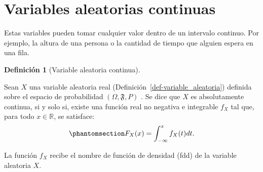 \documentclass[
  us-letterpaper,
]{scrreprt}
\theoremstyle{plain}
\theoremstyle{plain}
\theoremstyle{definition}
\newtheorem{definition}{Definición}[chapter]
\theoremstyle{remark}
\begin{document}
\section{Variables aleatorias
continuas}\label{variables-aleatorias-continuas}

\label{text-align:justify}
Estas variables pueden tomar cualquier valor dentro de un intervalo
continuo. Por ejemplo, la altura de una persona o la cantidad de tiempo
que alguien espera en una fila.

\begin{definition}[Variable aleatoria
continua]\protect\hypertarget{def-var_alea_cont}{}\label{def-var_alea_cont}

Sean \(X\) una variable aleatoria real
(Definición~\ref{def-variable_aleatoria}) definida sobre el espacio de
probabilidad \((\Omega, \mathfrak{F}, P)\) . Se dice que \(X\) es
absolutamente continua, si y solo si, existe una función real no
negativa e integrable \(f_X\) tal que, para todo \(x \in \mathbb{R}\),
se satisface:
\begin{equation}\phantomsection\label{eq-var_ale_con}{F_X(x) = \int_{-\infty}^x f_X(t)dt.}\end{equation}

La función \(f_X\) recibe el nombre de función de densidad (fdd) de la
variable aleatoria \(X\).

\end{definition}
\end{document}
